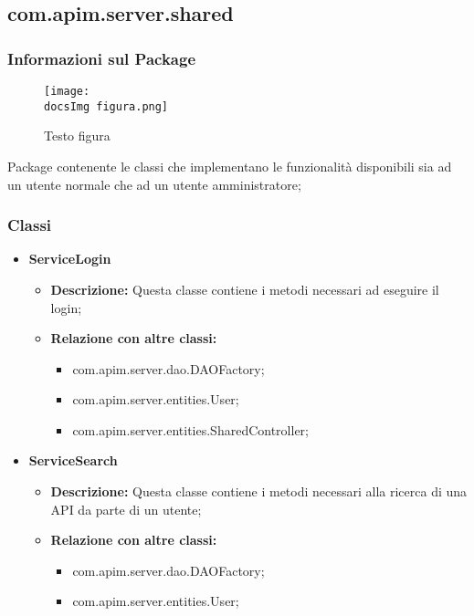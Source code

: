 {{{       \subsection{com.apim.server.shared}{
    \subsubsection{Informazioni sul Package}
        \begin{figure}[ht]
          \centering
          \texttt{[image: \\docsImg figura.png]}
          \caption{Testo figura}
          \label{Testo figura}
        \end{figure}
        Package  contenente le classi che implementano le funzionalità disponibili sia ad un utente normale che ad un utente amministratore;
        \subsubsection{Classi}
        \begin{itemize} \itemsep1pt
          \item \textbf{ServiceLogin}
          \begin{itemize}
            \item \textbf{Descrizione:} Questa classe contiene i metodi necessari ad eseguire il login;
            \item \textbf{Relazione con altre classi:}
            \begin{itemize}
              \item com.apim.server.dao.DAOFactory;
              \item com.apim.server.entities.User;
              \item com.apim.server.entities.SharedController;
            \end{itemize}
          \end{itemize}
          \item \textbf{ServiceSearch}
          \begin{itemize}
            \item \textbf{Descrizione:} Questa classe contiene i metodi necessari alla ricerca di una API da parte di un utente;
            \item \textbf{Relazione con altre classi:}
            \begin{itemize}
              \item com.apim.server.dao.DAOFactory;
              \item com.apim.server.entities.User;

\end{itemize}
\end{itemize}
\end{itemize}}}}}
